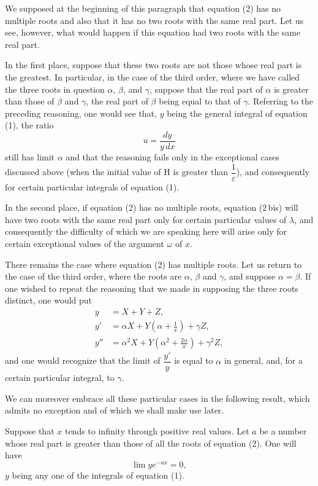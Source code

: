 \documentclass[11pt]{article}
\begin{document}
We supposed at the beginning of this paragraph that equation (2) has no multiple roots and also that it has no two roots with the same real part. Let us see, however, what would happen if this equation had two roots with the same real part.

In the first place, suppose that these two roots are not those whose real part is the greatest. In particular, in the case of the third order, where we have called the three roots in question $\alpha$, $\beta$, and $\gamma$, suppose that the real part of $\alpha$ is greater than those of $\beta$ and $\gamma$, the real part of $\beta$ being equal to that of $\gamma$. Referring to the preceding reasoning, one would see that, $y$ being the general integral of equation (1), the ratio
\[
u=\frac{dy}{y\,dx}
\]
still has limit $\alpha$ and that the reasoning fails only in the exceptional cases discussed above (when the initial value of H is greater than $\dfrac1\varepsilon$), and consequently for certain particular integrals of equation (1).

In the second place, if equation (2) has no multiple roots, equation (2\,bis) will have two roots with the same real part only for certain particular values of $\lambda$, and consequently the difficulty of which we are speaking here will arise only for certain exceptional values of the argument $\omega$ of $x$.

There remains the case where equation (2) has multiple roots. Let us return to the case of the third order, where the roots are $\alpha$, $\beta$ and $\gamma$, and suppose $\alpha=\beta$. If one wished to repeat the reasoning that we made in supposing the three roots distinct, one would put
\[
\begin{aligned}
y&=X+Y+Z,\\
y'&=\alpha X+Y\left(\alpha+\frac1x\right)+\gamma Z,\\
y''&=\alpha^2X+Y\left(\alpha^2+\frac{2\alpha}{x}\right)+\gamma^2Z,
\end{aligned}
\]
and one would recognize that the limit of $\dfrac{y'}{y}$ is equal to $\alpha$ in general, and, for a certain particular integral, to $\gamma$.

We can moreover embrace all these particular cases in the following result, which admits no exception and of which we shall make use later.

Suppose that $x$ tends to infinity through positive real values. Let $a$ be a number whose real part is greater than those of all the roots of equation (2). One will have
\[
\lim ye^{-ax}=0,
\]
$y$ being any one of the integrals of equation (1).
\end{document}

